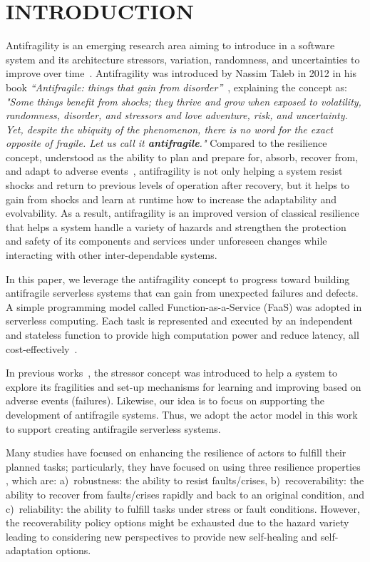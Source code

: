 \documentclass[conference]{IEEEtran}
\begin{document}
\section{\uppercase{Introduction}}
Antifragility is an emerging research area aiming to introduce in a software system and its architecture stressors, variation, randomness, and uncertainties to improve over time~\cite{taleb2012antifragile,hind-icsme2022,hind-iotbds22}. Antifragility was introduced by Nassim Taleb in 2012 in his book \textit{“Antifragile: things that gain from disorder”}~\cite{taleb2012antifragile}, explaining the concept as: \emph{"Some things benefit from shocks; they thrive and grow when exposed to volatility, randomness, disorder, and stressors and love adventure, risk, and uncertainty. Yet, despite the ubiquity of the phenomenon, there is no word for the exact opposite of fragile. Let us call it \textbf{antifragile}."} Compared to the resilience concept, understood as the ability to plan and prepare for, absorb, recover from, and adapt to adverse events~\cite{national2012disaster}, antifragility is not only helping a system resist shocks and return to previous levels of operation after recovery, but it helps to gain from shocks and learn at runtime how to increase the adaptability and evolvability. As a result, antifragility is an improved version of classical resilience that helps a system handle a variety of hazards and strengthen the protection and safety of its components and services under unforeseen changes while interacting with other inter-dependable systems. 

In this paper, we leverage the antifragility concept to progress toward building antifragile serverless systems that can gain from unexpected failures and defects. A simple programming model called Function-as-a-Service (FaaS) was adopted in serverless computing. Each task is represented and executed by an independent and stateless function to provide high computation power and reduce latency, all cost-effectively~\cite{taibi2020serverless}.

In previous works~\cite{hind-icsme2022}, the stressor concept was introduced to help a system to explore its fragilities and set-up mechanisms for learning and improving based on adverse events (failures). Likewise, our idea is to focus on supporting the development of antifragile systems. Thus, we adopt the actor model in this work to support creating antifragile serverless systems.

Many studies have focused on enhancing the resilience of actors to fulfill their planned tasks; particularly, they have focused on using three resilience properties \cite{de2020automated,cao2021intelligent}, which are: a)~robustness: the ability to resist faults/crises, b)~recoverability: the ability to recover from faults/crises rapidly and back to an original condition, and c)~reliability: the ability to fulfill tasks under stress or fault conditions. However, the recoverability policy options might be exhausted due to the hazard variety \cite{wang2022machine,ramezani2020approaches,bangui2022blockchain} leading to considering new perspectives to provide new self-healing and self-adaptation options.
\end{document}

